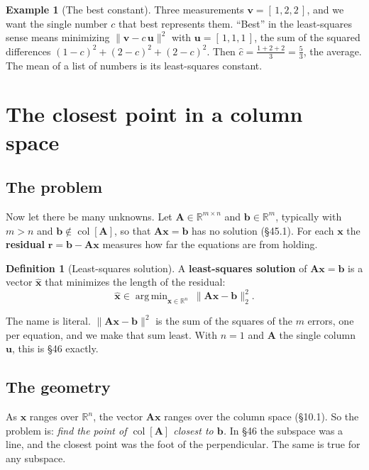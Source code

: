 \documentclass[11pt]{article}
\theoremstyle{plain}
\theoremstyle{definition}
\newtheorem{defn}{Definition}[section]
\newtheorem{ex}{Example}[section]
\theoremstyle{remark}
\newcommand{\R}{\mathbb{R}}
\newcommand{\vc}[1]{\mathbf{#1}}
\newcommand{\mt}[1]{\mathbf{#1}}
\newcommand{\norm}[1]{\lVert #1\rVert}
\newcommand{\colsp}[1]{\operatorname{col}[#1]}
\newcommand{\xh}{\hat{\vc{x}}}
\DeclareMathOperator*{\argmin}{arg\,min}
\begin{document}
\begin{ex}[The best constant]
\label{ex:mean}
Three measurements $\vc{v}=[\,1,2,2\,]$, and we want the single number $c$ that
best represents them. ``Best'' in the least-squares sense means minimizing
$\norm{\vc{v}-c\,\vc{u}}^{2}$ with $\vc{u}=[\,1,1,1\,]$, the sum of the squared
differences $(1-c)^{2}+(2-c)^{2}+(2-c)^{2}$. Then
$\hat c=\frac{1+2+2}{3}=\frac53$, the average. The mean of a list of numbers is
its least-squares constant.
\end{ex}

\section{The closest point in a column space}

\subsection{The problem}
Now let there be many unknowns. Let $\mt{A}\in\R^{m\times n}$ and
$\vc{b}\in\R^{m}$, typically with $m>n$ and $\vc{b}\notin\colsp{\mt{A}}$, so that
$\mt{A}\vc{x}=\vc{b}$ has no solution (\S45.1). For each $\vc{x}$ the
\textbf{residual} $\vc{r}=\vc{b}-\mt{A}\vc{x}$ measures how far the equations are
from holding.

\begin{defn}[Least-squares solution]
A \textbf{least-squares solution} of $\mt{A}\vc{x}=\vc{b}$ is a vector $\xh$ that
minimizes the length of the residual:
\[
  \xh\in\argmin_{\vc{x}\in\R^{n}}\ \norm{\mt{A}\vc{x}-\vc{b}}_2^{2}.
\]
\end{defn}

\noindent The name is literal. $\norm{\mt{A}\vc{x}-\vc{b}}^{2}$ is the sum of the
squares of the $m$ errors, one per equation, and we make that sum least. With
$n=1$ and $\mt{A}$ the single column $\vc{u}$, this is \S46 exactly.

\subsection{The geometry}
As $\vc{x}$ ranges over $\R^{n}$, the vector $\mt{A}\vc{x}$ ranges over the
column space (\S10.1). So the problem is: \emph{find the point of
$\colsp{\mt{A}}$ closest to $\vc{b}$.} In \S46 the subspace was a line, and the
closest point was the foot of the perpendicular. The same is true for any
subspace.
\end{document}
